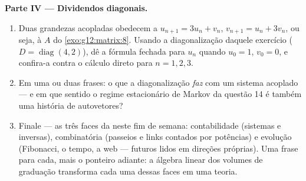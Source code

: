 \begin{problem}
\medskip
\noindent\textbf{Parte IV --- Dividendos diagonais.}
\begin{enumerate}[resume]
  \item Duas grandezas acopladas obedecem a
        $u_{n+1} = 3u_n + v_n$, $v_{n+1} = u_n + 3v_n$, ou
        seja, à  $A$ do \cref{exo:g12:matrix:8}. Usando a
        diagonalização daquele exercício
        ($D = \operatorname{diag}(4, 2)$), dê a fórmula fechada
        para $u_n$ quando $u_0 = 1$, $v_0 = 0$, e confira-a
        contra o cálculo direto para $n = 1, 2, 3$.
  \item Em uma ou duas frases: o que a diagonalização
        \emph{faz} com um sistema acoplado --- e em que sentido
        o regime estacionário de Markov da questão 14 é
        também uma história de autovetores?
  \item Finale --- as três faces da  neste fim de semana:
        contabilidade (sistemas e inversas), combinatória
        (passeios e links contados por potências) e evolução
        (Fibonacci, o tempo, a web --- futuros lidos em
        direções próprias). Uma frase para cada, mais o
        ponteiro adiante: a álgebra linear dos volumes de
        graduação transforma cada uma dessas faces em uma
        teoria.
\end{enumerate}
\end{problem}
